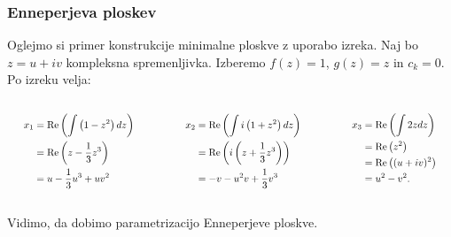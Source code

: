 \documentclass[10pt]{beamer}
\theoremstyle{definition}
\theoremstyle{remark}
\theoremstyle{plain}
\numberwithin{equation}{section}  %
\begin{document}
\begin{frame}
    \frametitle{Enneperjeva ploskev}

    Oglejmo si primer konstrukcije minimalne ploskve z uporabo izreka. Naj bo $z=u+iv$ kompleksna spremenljivka. Izberemo $f(z)=1$, $g(z)=z$ in $c_k = 0$. Po izreku velja:
    \begin{columns}[t]
        \begin{column}{0.3\textwidth}
            $$
            \scalebox{0.8}{$
            \begin{aligned}
            x_1 &=\operatorname{Re}\left(\int\left(1-z^2\right) d z\right) \\
            &=\operatorname{Re}\left(z-\frac{1}{3} z^3\right) \\
            &=u-\frac{1}{3} u^3+u v^2
            \end{aligned}$}
            $$
        \end{column}

        \begin{column}{0.3\textwidth}
            $$
            \scalebox{0.8}{$
            \begin{aligned}
            x_2 &=\operatorname{Re}\left(\int i\left(1+z^2\right) d z\right) \\
            &=\operatorname{Re}\left(i\left(z+\frac{1}{3} z^3\right)\right) \\
            &=-v-u^2 v+\frac{1}{3} v^3
            \end{aligned}$}
            $$
        \end{column}

        \begin{column}{0.3\textwidth}
            $$
            \scalebox{0.8}{$
            \begin{aligned}
            x_3 &=\operatorname{Re}\left(\int 2 z d z\right) \\
            &=\operatorname{Re}\left(z^2\right) \\
            &= \operatorname{Re}\left((u+i v)^2\right) \\
            &=u^2-v^2 .
            \end{aligned}$}
            $$
        \end{column}

    \end{columns}

    \vspace{3em}

    Vidimo, da dobimo parametrizacijo Enneperjeve ploskve.
\end{frame}
\end{document}

